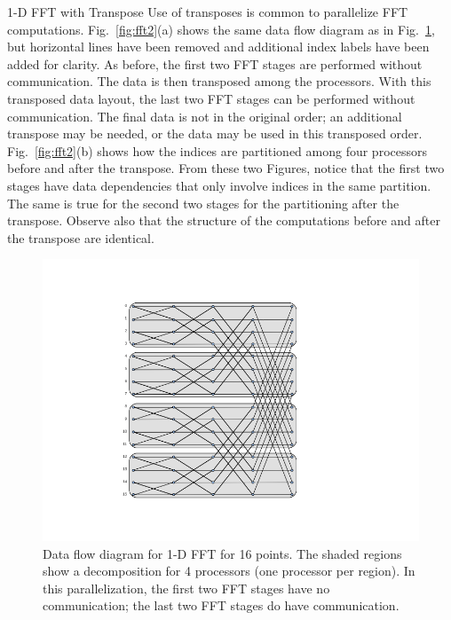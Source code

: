  {1-D FFT with Transpose}
Use of transposes is common to parallelize FFT computations.
Fig.~\ref{fig:fft2}(a) shows the same data flow diagram as in
Fig.~\ref{fig:fft1}, but horizontal lines have been removed and additional
index labels have been added for clarity.  As before, the first two FFT
stages are performed without communication.  The data is then transposed
among the processors.  With this transposed data layout, the last two
FFT stages can be performed without communication.  The final data is
not in the original order; an additional transpose may be needed, or the
data may be used in this transposed order.  Fig.~\ref{fig:fft2}(b) shows
how the indices are partitioned among four processors before and after
the transpose.  From these two Figures, notice that the first two stages
have data dependencies that only involve indices in the same partition.
The same is true for the second two stages for the partitioning after
the transpose.  Observe also that the structure of the computations
before and after the transpose are identical.

\begin{figure}[htbp]
\begin{center}
\includegraphics[clip=true,viewport=144 85 576 540,scale=.5]{mdchapter/fig-fft-first}
\caption{Data flow diagram for 1-D FFT for 16 points.  The shaded
regions show a decomposition for 4 processors (one processor per region).
In this parallelization, 
the first two FFT stages have no communication; the last two FFT stages
do have communication.}
\label{fig:fft1}
\end{center}
\end{figure}

